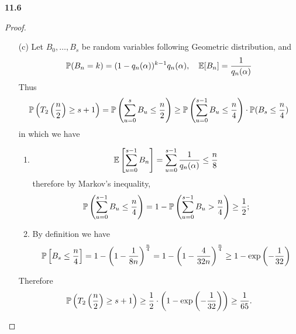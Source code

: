 \noindent\textbf{11.6}
\begin{proof}
\begin{itemize}
    \item[(c)] Let $B_0, \dots, B_s$ be random variables following Geometric distribution, and
    \begin{equation}
        \mathbb{P}(B_n = k) = (1 - q_n(\alpha))^{k-1} q_n(\alpha), \quad \mathbb{E}[B_n] = \frac{1}{q_n(\alpha)}\notag
    \end{equation}
    Thus
    \begin{equation}
        \mathbb{P}\left(T_2\left(\frac{n}{2}\right) \geq s+1\right) = \mathbb{P}\left( \sum_{u=0}^s B_u \leq \frac{n}{2} \right) \geq \mathbb{P}\left( \sum_{u=0}^{s-1} B_u \leq \frac{n}{4} \right) \cdot \mathbb{P}(B_s \leq \frac{n}{4})\notag
    \end{equation}
    in which we have
    \begin{enumerate}
        \item 
        \begin{equation}
            \mathbb{E}\left[ \sum_{u=0}^{s-1} B_n\right] = \sum_{u=0}^{s-1} \frac{1}{q_n(\alpha)} \leq \frac{n}{8}\notag
        \end{equation}
        therefore by Markov's inequality,
        \begin{equation}
            \mathbb{P}\left( \sum_{u=0}^{s-1} B_u \leq \frac{n}{4} \right) = 1 - \mathbb{P}\left( \sum_{u=0}^{s-1} B_u > \frac{n}{4} \right) \geq \frac{1}{2};\notag
        \end{equation}
        \item By definition we have
        \begin{equation}
            \mathbb{P}\left[ B_s \leq \frac{n}{4} \right] =  1 - \left( 1 - \frac{1}{8n}\right)^{\frac{n}{4}} = 1 - \left( 1 - \frac{4}{32 n}\right)^{\frac{n}{4}} \geq 1 - \exp\left(-\frac{1}{32}\right)\notag
        \end{equation}
    \end{enumerate}
    Therefore
    \begin{equation}
        \mathbb{P}\left(T_2\left(\frac{n}{2}\right) \geq s+1\right) \geq \frac{1}{2} \cdot \left( 1 - \exp\left(-\frac{1}{32}\right) \right) \geq \frac{1}{65}.\notag
    \end{equation}
\end{itemize}
\end{proof}

